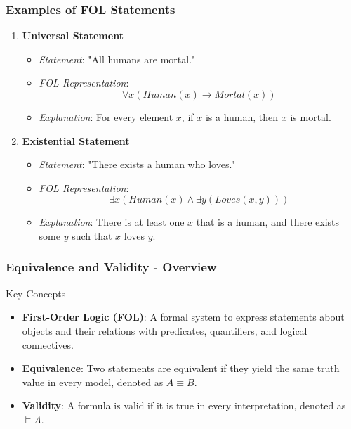 \documentclass[aspectratio=169]{beamer}
\begin{document}
\begin{frame}[fragile]
    \frametitle{Examples of FOL Statements}

    \begin{enumerate}
        \item \textbf{Universal Statement}
            \begin{itemize}
                \item \textit{Statement}: "All humans are mortal."
                \item \textit{FOL Representation}: 
                \[
                \forall x (Human(x) \rightarrow Mortal(x))
                \]
                \item \textit{Explanation}: For every element \(x\), if \(x\) is a human, then \(x\) is mortal.
            \end{itemize}
        
        \item \textbf{Existential Statement}
            \begin{itemize}
                \item \textit{Statement}: "There exists a human who loves."
                \item \textit{FOL Representation}: 
                \[
                \exists x (Human(x) \land \exists y (Loves(x, y)))
                \]
                \item \textit{Explanation}: There is at least one \(x\) that is a human, and there exists some \(y\) such that \(x\) loves \(y\).
            \end{itemize}   
    \end{enumerate}
\end{frame}

\begin{frame}[fragile]
    \frametitle{Equivalence and Validity - Overview}
    
    \begin{block}{Key Concepts}
        \begin{itemize}
            \item \textbf{First-Order Logic (FOL)}: A formal system to express statements about objects and their relations with predicates, quantifiers, and logical connectives.
            \item \textbf{Equivalence}: Two statements are equivalent if they yield the same truth value in every model, denoted as \( A \equiv B \).
            \item \textbf{Validity}: A formula is valid if it is true in every interpretation, denoted as \( ⊨ A \).
        \end{itemize}
    \end{block}
    
\end{frame}
\end{document}
